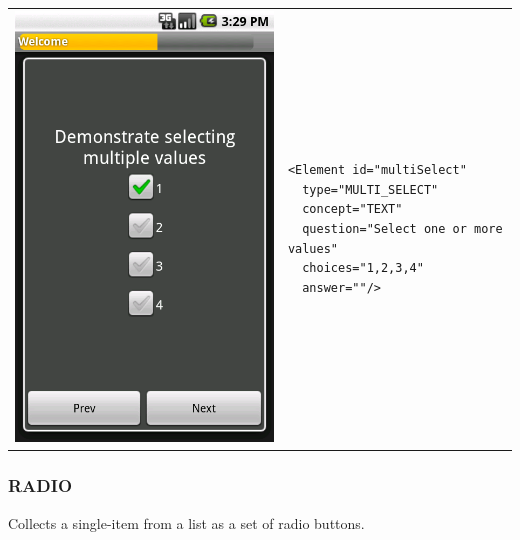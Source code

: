 \documentclass[a4paper,10pt]{article}
\begin{document}
\noindent\begin{tabular}{ p{3.5cm}  p{7.5cm} }
\includegraphics[scale=0.2,keepaspectratio=true]{client_multi_select.png}
& \begin{verbatim}
<Element id="multiSelect"
  type="MULTI_SELECT"  
  concept="TEXT"  
  question="Select one or more values"  
  choices="1,2,3,4"
  answer=""/>\end{verbatim}
\end{tabular}

\subsubsection{RADIO} Collects a single-item from a list as a set of radio
buttons.
\end{document}
